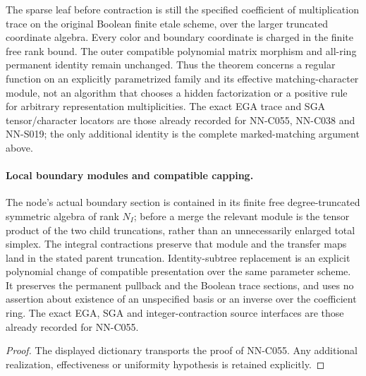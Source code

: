 \begin{geometricstatement}[NN-C055]
The sparse leaf before contraction is still the specified
coefficient of multiplication trace on the original Boolean
finite etale scheme, over the larger truncated coordinate
algebra.  Every color and boundary coordinate is charged in
the finite free rank bound.  The outer compatible polynomial
matrix morphism and all-ring permanent identity remain unchanged.
Thus the theorem concerns a regular function on an explicitly
parametrized family and its effective matching-character module,
not an algorithm that chooses a hidden factorization or a
positive rule for arbitrary representation multiplicities.
The exact EGA trace and SGA tensor/character locators are those
already recorded for NN-C055, NN-C038 and NN-S019; the only
additional identity is the complete marked-matching argument above.

\paragraph{Local boundary modules and compatible capping.}
The node's actual boundary section is contained in its finite
free degree-truncated symmetric algebra of rank $N_I$; before
a merge the relevant module is the tensor product of the two
child truncations, rather than an unnecessarily enlarged total
simplex.  The integral contractions preserve that module and
the transfer maps land in the stated parent truncation.
Identity-subtree replacement is an explicit polynomial change
of compatible presentation over the same parameter scheme.
It preserves the permanent pullback and the Boolean trace
sections, and uses no assertion about existence of an unspecified
basis or an inverse over the coefficient ring.  The exact EGA,
SGA and integer-contraction source interfaces are those already
recorded for NN-C055.
\end{geometricstatement}
\begin{proof} The displayed dictionary transports the proof of NN-C055. Any additional realization, effectiveness or uniformity hypothesis is retained explicitly.\end{proof}


